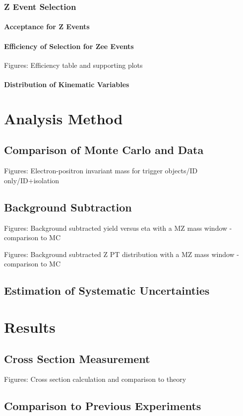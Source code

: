 \documentclass [11pt, twoside] {uwthesis}
\begin{document}
\subsection{Z Event Selection}
\subsubsection{Acceptance for Z Events}
\subsubsection{Efficiency of Selection for Zee Events}
Figures: Efficiency table and supporting plots
\subsubsection{Distribution of Kinematic Variables}
\chapter{Analysis Method}
\section{Comparison of Monte Carlo and Data}
Figures: Electron-positron invariant mass for trigger objects/ID only/ID+isolation
\section{Background Subtraction}
Figures: Background subtracted yield versus eta with a MZ mass window - comparison to MC

Figures: Background subtracted Z PT distribution with a MZ mass window - comparison to MC
\section{Estimation of Systematic Uncertainties}
\chapter{Results}
\section{Cross Section Measurement}
Figures: Cross section calculation and comparison to theory
\section{Comparison to Previous Experiments}
\end{document}
